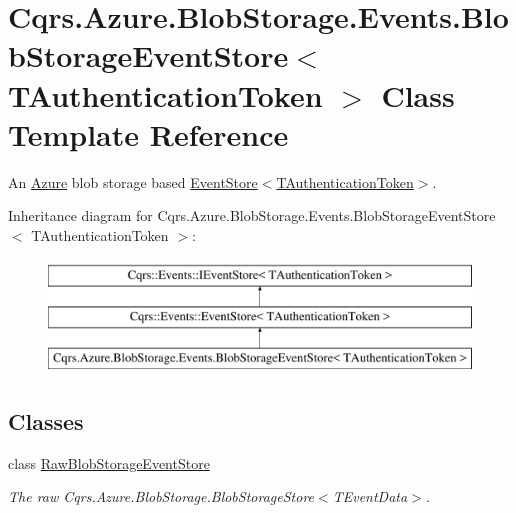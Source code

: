 \hypertarget{classCqrs_1_1Azure_1_1BlobStorage_1_1Events_1_1BlobStorageEventStore}{}\section{Cqrs.\+Azure.\+Blob\+Storage.\+Events.\+Blob\+Storage\+Event\+Store$<$ T\+Authentication\+Token $>$ Class Template Reference}
\label{classCqrs_1_1Azure_1_1BlobStorage_1_1Events_1_1BlobStorageEventStore}


An \hyperlink{namespaceCqrs_1_1Azure}{Azure} blob storage based \hyperlink{classCqrs_1_1Events_1_1EventStore_a6346cb2aea4c5b4e740dc6cfb15abab8_a6346cb2aea4c5b4e740dc6cfb15abab8}{Event\+Store$<$\+T\+Authentication\+Token$>$}.  


Inheritance diagram for Cqrs.\+Azure.\+Blob\+Storage.\+Events.\+Blob\+Storage\+Event\+Store$<$ T\+Authentication\+Token $>$\+:\begin{figure}[H]
\begin{center}
\leavevmode
\includegraphics[height=3.000000cm]{classCqrs_1_1Azure_1_1BlobStorage_1_1Events_1_1BlobStorageEventStore}
\end{center}
\end{figure}
\subsection*{Classes}
\begin{DoxyCompactItemize}
\item 
class \hyperlink{classCqrs_1_1Azure_1_1BlobStorage_1_1Events_1_1BlobStorageEventStore_1_1RawBlobStorageEventStore}{Raw\+Blob\+Storage\+Event\+Store}
\begin{DoxyCompactList}\small\item\em The raw Cqrs.\+Azure.\+Blob\+Storage.\+Blob\+Storage\+Store$<$\+T\+Event\+Data$>$. \end{DoxyCompactList}\end{DoxyCompactItemize}
